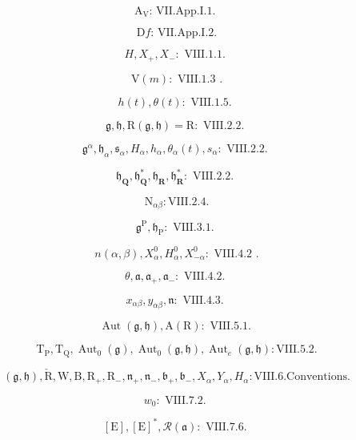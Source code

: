 \[
\mathrm{A} _ {\mathrm{V}} \text {: VII.App.I.1. }
\]

\[
\mathrm{D} f \text {: VII.App.I.2.}
\]

\[
H, X _ {+}, X _ {-}: \text {   VIII.1.1.   }
\]

\[
\mathrm{V} (m): \text { VIII.1.3 }.
\]

\[
h (t), \theta (t): \text {   VIII.1.5.   }
\]

\[
\mathfrak {g}, \mathfrak {h}, \mathrm{R} (\mathfrak {g}, \mathfrak {h}) = \mathrm{R}: \text {   VIII.2.2.   }
\]

\[
\mathfrak {g} ^ {\alpha}, \mathfrak {h} _ {\alpha}, \mathfrak {s} _ {\alpha}, H _ {\alpha}, h _ {\alpha}, \theta_ {\alpha} (t), s _ {\alpha}: \text {   VIII.2.2.   }
\]

\[
\mathfrak {h} _ {\mathbf {Q}}, \mathfrak {h} _ {\mathbf {Q}} ^ {*}, \mathfrak {h} _ {\mathbf {R}}, \mathfrak {h} _ {\mathbf {R}} ^ {*}: \text {   VIII.2.2.   }
\]

\[
\mathrm{N} _ {\alpha \beta}: \mathrm{VIII.2.4}.
\]

\[
\mathfrak {g} ^ {\mathrm{P}}, \mathfrak {h} _ {\mathrm{P}}: \text {   VIII.3.1.   }
\]

\[
n (\alpha , \beta), X _ {\alpha} ^ {0}, H _ {\alpha} ^ {0}, X _ {- \alpha} ^ {0}: \text { VIII.4.2 }.
\]

\[
\theta , \mathfrak {a}, \mathfrak {a} _ {+}, \mathfrak {a} _ {-}: \text {   VIII.4.2.   }
\]

\[
x _ {\alpha \beta}, y _ {\alpha \beta}, \mathfrak {n}: \text {   VIII.4.3.   }
\]

\[
\operatorname{Aut} (\mathfrak {g}, \mathfrak {h}), \mathrm{A} (\mathrm{R}): \text {   VIII.5.1.   }
\]

\[
\mathrm{T} _ {\mathrm{P}}, \mathrm{T} _ {\mathrm{Q}}, \operatorname{Aut} _ {0} (\mathfrak {g}), \operatorname{Aut} _ {0} (\mathfrak {g}, \mathfrak {h}), \operatorname{Aut} _ {e} (\mathfrak {g}, \mathfrak {h}): \text {VIII.5.2}.
\]

\[
(\mathfrak {g}, \mathfrak {h}), \check {\mathrm{R}}, \mathrm{W}, \mathrm{B}, \mathrm{R} _ {+}, \mathrm{R} _ {-}, \mathfrak {n} _ {+}, \mathfrak {n} _ {-}, \mathfrak {b} _ {+}, \mathfrak {b} _ {-}, X _ {\alpha}, Y _ {\alpha}, H _ {\alpha}: \text {VIII.6.Conventions.}
\]

\[
w _ {0} \colon \text {   VIII.7.2.   }
\]

\[
[ \mathrm{E} ], [ \mathrm{E} ] ^ {*}, \mathscr {R} (\mathfrak {a}): \text {   VIII.7.6.   }
\]

